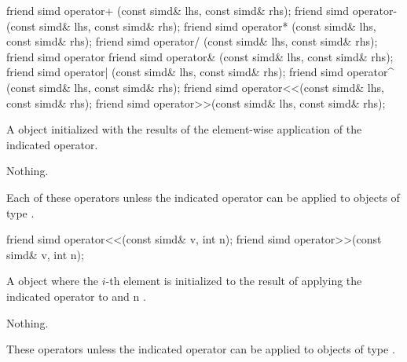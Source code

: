 
\begin{itemdecl}
friend simd operator+ (const simd& lhs, const simd& rhs);
friend simd operator- (const simd& lhs, const simd& rhs);
friend simd operator* (const simd& lhs, const simd& rhs);
friend simd operator/ (const simd& lhs, const simd& rhs);
friend simd operator%
friend simd operator& (const simd& lhs, const simd& rhs);
friend simd operator| (const simd& lhs, const simd& rhs);
friend simd operator^ (const simd& lhs, const simd& rhs);
friend simd operator<<(const simd& lhs, const simd& rhs);
friend simd operator>>(const simd& lhs, const simd& rhs);
\end{itemdecl}
\begin{itemdescr}
  \pnum\returns A \simd object initialized with the results of the element-wise application of the indicated operator.

  \pnum\throws Nothing.

  \pnum\remarks Each of these operators \specialsfinae unless the indicated operator can be applied to objects of type .
\end{itemdescr}

\begin{itemdecl}
friend simd operator<<(const simd& v, int n);
friend simd operator>>(const simd& v, int n);
\end{itemdecl}
\begin{itemdescr}
  \pnum\returns A \simd object where the $i$-th element is initialized to the result of applying the indicated operator to  and \code n \foralli.

  \pnum\throws Nothing.

  \pnum\remarks These operators \specialsfinae unless the indicated operator can be applied to objects of type .
\end{itemdescr}

